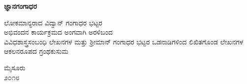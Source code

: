 {\fontsize{14}{16}\selectfont
\thispagestyle{empty}
\centerline{{\fontsize{40}{42}\bfseries ಜ್ಞಾನಗಂಗಾಧರ}}
\bigskip
\begin{center}
{\large ಲೋಕಮಾನ್ಯರಾದ ವಿದ್ವಾನ್ ಗಂಗಾಧರ ಭಟ್ಟರ \\ಅಭಿವಂದನ ಕಾರ್ಯಕ್ರಮದ
ಅಂಗವಾಗಿ ಅರಳಿಬಂದ\\ ವಿವಿಧಶಾಸ್ತ್ರಸಂಬಂಧಿ ಲೇಖನಗಳ
ಮತ್ತು ಶ್ರೀಮಾನ್ ಗಂಗಾಧರ ಭಟ್ಟರ ಒಡನಾಡಿಗಳಿಂದ ಲಿಖಿತಗೊಂಡ ಲೇಖನಗಳ\\
ಆಕಲನರೂಪದ ಗ್ರಂಥಕುಸುಮ}
\end{center}
\vfill



\vfill
\begin{center}
\bigskip
{\large ಮೈಸೂರು\\
\smallskip
೨೦೧೮}
\end{center}
}
